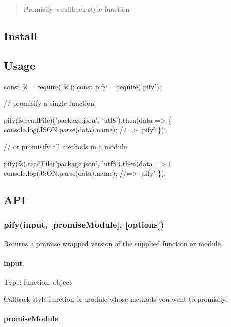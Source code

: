 \begin{quote}
Promisify a callback-\/style function \end{quote}


\subsection*{Install}




\subsection*{Usage}


\begin{DoxyCode}
const fs = require('fs');
const pify = require('pify');

// promisify a single function

pify(fs.readFile)('package.json', 'utf8').then(data => \{
  console.log(JSON.parse(data).name);
  //=> 'pify'
\});

// or promisify all methods in a module

pify(fs).readFile('package.json', 'utf8').then(data => \{
  console.log(JSON.parse(data).name);
  //=> 'pify'
\});
\end{DoxyCode}


\subsection*{A\+PI}

\subsubsection*{pify(input, \mbox{[}promise\+Module\mbox{]}, \mbox{[}options\mbox{]})}

Returns a promise wrapped version of the supplied function or module.

\paragraph*{input}

Type\+: {\ttfamily function}, {\ttfamily object}

Callback-\/style function or module whose methods you want to promisify.

\paragraph*{promise\+Module}


